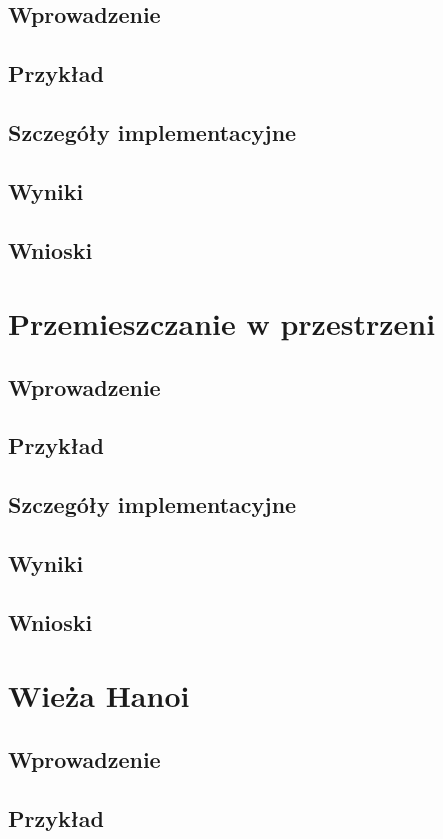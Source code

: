     \subsection{Wprowadzenie}
        
    \subsection{Przykład}
    \subsection{Szczegóły implementacyjne}
    \subsection{Wyniki}
    \subsection{Wnioski}
\section{Przemieszczanie w przestrzeni}
    \subsection{Wprowadzenie}
    \subsection{Przykład}
    \subsection{Szczegóły implementacyjne}
    \subsection{Wyniki}
    \subsection{Wnioski}
\section{Wieża Hanoi}
    \subsection{Wprowadzenie}
    \subsection{Przykład}
